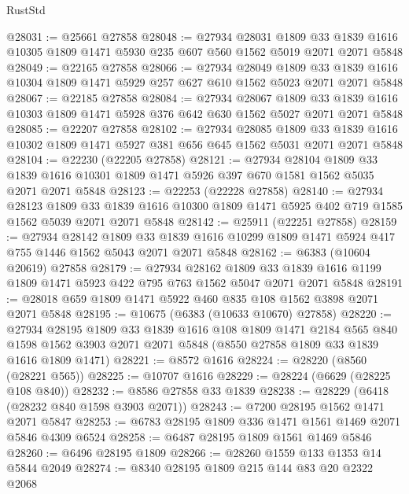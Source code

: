 \begin{lexlean}{RustStd}
\begin{coremodule}
@28031 := @25661 @27858
@28048 := @27934
    @28031
    @1809
    @33
    @1839
    @1616
    @10305
    @1809
    @1471
    @5930
    @235
    @607
    @560
    @1562
    @5019
    @2071
    @2071
    @5848
@28049 := @22165 @27858
@28066 := @27934
    @28049
    @1809
    @33
    @1839
    @1616
    @10304
    @1809
    @1471
    @5929
    @257
    @627
    @610
    @1562
    @5023
    @2071
    @2071
    @5848
@28067 := @22185 @27858
@28084 := @27934
    @28067
    @1809
    @33
    @1839
    @1616
    @10303
    @1809
    @1471
    @5928
    @376
    @642
    @630
    @1562
    @5027
    @2071
    @2071
    @5848
@28085 := @22207 @27858
@28102 := @27934
    @28085
    @1809
    @33
    @1839
    @1616
    @10302
    @1809
    @1471
    @5927
    @381
    @656
    @645
    @1562
    @5031
    @2071
    @2071
    @5848
@28104 := @22230 (@22205 @27858)
@28121 := @27934
    @28104
    @1809
    @33
    @1839
    @1616
    @10301
    @1809
    @1471
    @5926
    @397
    @670
    @1581
    @1562
    @5035
    @2071
    @2071
    @5848
@28123 := @22253 (@22228 @27858)
@28140 := @27934
    @28123
    @1809
    @33
    @1839
    @1616
    @10300
    @1809
    @1471
    @5925
    @402
    @719
    @1585
    @1562
    @5039
    @2071
    @2071
    @5848
@28142 := @25911 (@22251 @27858)
@28159 := @27934
    @28142
    @1809
    @33
    @1839
    @1616
    @10299
    @1809
    @1471
    @5924
    @417
    @755
    @1446
    @1562
    @5043
    @2071
    @2071
    @5848
@28162 := @6383 (@10604 @20619) @27858
@28179 := @27934
    @28162
    @1809
    @33
    @1839
    @1616
    @1199
    @1809
    @1471
    @5923
    @422
    @795
    @763
    @1562
    @5047
    @2071
    @2071
    @5848
@28191 := @28018 @659 @1809 @1471 @5922 @460 @835 @108 @1562 @3898 @2071 @2071 @5848
@28195 := @10675 (@6383 (@10633 @10670) @27858)
@28220 := @27934
    @28195
    @1809
    @33
    @1839
    @1616
    @108
    @1809
    @1471
    @2184
    @565
    @840
    @1598
    @1562
    @3903
    @2071
    @2071
    @5848
    (@8550 @27858 @1809 @33 @1839 @1616 @1809 @1471)
@28221 := @8572 @1616
@28224 := @28220 (@8560 (@28221 @565))
@28225 := @10707 @1616
@28229 := @28224 (@6629 (@28225 @108 @840))
@28232 := @8586 @27858 @33 @1839
@28238 := @28229 (@6418 (@28232 @840 @1598 @3903 @2071))
@28243 := @7200 @28195 @1562 @1471 @2071 @5847
@28253 := @6783 @28195 @1809 @336 @1471 @1561 @1469 @2071 @5846 @4309 @6524
@28258 := @6487 @28195 @1809 @1561 @1469 @5846
@28260 := @6496 @28195 @1809
@28266 := @28260 @1559 @133 @1353 @14 @5844 @2049
@28274 := @8340 @28195 @1809 @215 @144 @83 @20 @2322 @2068

\end{coremodule}
\end{lexlean}
